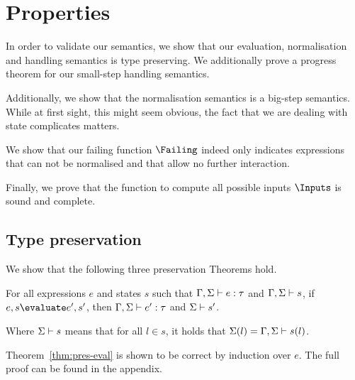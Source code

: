 


\section{Properties}
\label{sec:properties}




In order to validate our semantics, we show that our evaluation, normalisation
and handling semantics is type preserving. We additionally prove a progress
theorem for our small-step handling semantics.

Additionally, we show that the normalisation semantics is a big-step semantics. 
While at first sight, this might seem obvious, the fact that we are dealing with
state complicates matters.

We show that our failing function $\Failing$ indeed only indicates expressions
that can not be normalised and that allow no further interaction.

Finally, we prove that the function to compute all possible inputs $\Inputs$ is sound and complete.



\subsection{Type preservation}
\label{sub:preservation}

We show that the following three preservation Theorems hold.

\begin{theorem}
  For all expressions $e$ and states $s$
  such that $\Gamma,\Sigma \vdash e:\tau$ and $\Gamma,\Sigma \vdash s$,
  if $e,s \evaluate e',s'$,
  then $\Gamma,\Sigma \vdash e':\tau$ and $\Sigma \vdash s'$.
  \label{thm:pres-eval}
\end{theorem}

Where $\Sigma \vdash s$ means that for all $l\in s$, it holds that
$\Sigma(l)=\Gamma,\Sigma\vdash s(l)$.

Theorem~\ref{thm:pres-eval} is shown to be correct by induction over $e$. The full
proof can be found in the appendix.


